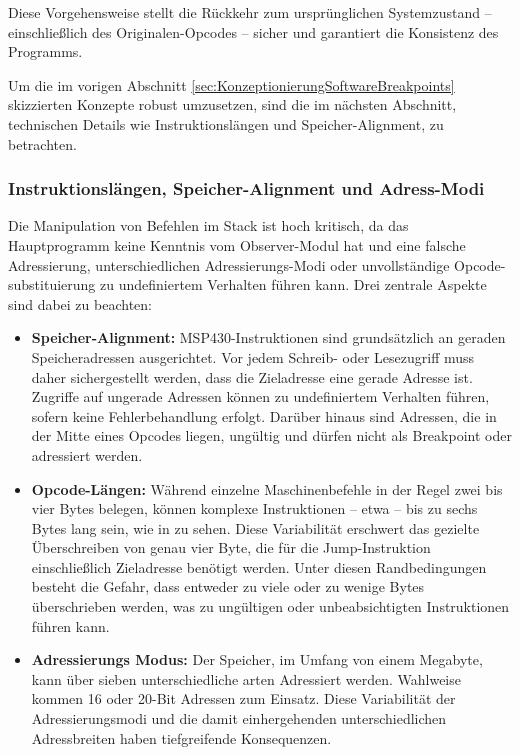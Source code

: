 Diese Vorgehensweise stellt die R\"uckkehr zum urspr\"unglichen Systemzustand – einschlie{\ss}lich des Originalen-Opcodes – sicher und garantiert die Konsistenz des Programms.

Um die im vorigen Abschnitt \ref{sec:KonzeptionierungSoftwareBreakpoints} skizzierten Konzepte robust umzusetzen, sind die im n\"achsten Abschnitt, technischen Details wie Instruktionsl\"angen und Speicher-Alignment, zu betrachten.\AI

\subsubsection{Instruktionsl\"angen, Speicher-Alignment und Adress-Modi}
\label{sec:TechnischeUmsetzunSoftwareBreakpoints}

Die Manipulation von Befehlen im Stack ist hoch kritisch, da das Hauptprogramm keine Kenntnis vom Observer-Modul hat und eine falsche Adressierung, unterschiedlichen Adressierungs-Modi oder unvollst\"andige Opcode-substituierung zu undefiniertem Verhalten f\"uhren kann. Drei zentrale Aspekte sind dabei zu beachten:

\begin{itemize}
	\item \textbf{Speicher-Alignment:} MSP430-Instruktionen sind grundsätzlich an geraden Speicheradressen ausgerichtet. Vor jedem Schreib- oder Lesezugriff muss daher sichergestellt werden, dass die Zieladresse eine gerade Adresse ist. Zugriffe auf ungerade Adressen können zu undefiniertem Verhalten führen, sofern keine Fehlerbehandlung erfolgt. Darüber hinaus sind Adressen, die in der Mitte eines Opcodes liegen, ungültig und dürfen nicht als Breakpoint oder adressiert werden.
	
	\item \textbf{Opcode-L\"angen:} W\"ahrend einzelne Maschinenbefehle in der Regel zwei bis vier Bytes belegen, k\"onnen komplexe Instruktionen – etwa  – bis zu sechs Bytes lang sein, wie in  zu sehen.  Diese Variabilit\"at erschwert das gezielte \"Uberschreiben von genau vier Byte, die f\"ur die Jump-Instruktion einschlie{\ss}lich Zieladresse ben\"otigt werden. Unter diesen Randbedingungen besteht die Gefahr, dass entweder zu viele oder zu wenige Bytes \"uberschrieben werden, was zu ung\"ultigen oder unbeabsichtigten Instruktionen f\"uhren kann.
	
	\item \textbf{Adressierungs Modus:} Der Speicher, im Umfang von einem Megabyte, kann \"uber sieben unterschiedliche arten Adressiert werden. Wahlweise kommen 16 oder 20-Bit Adressen zum Einsatz. Diese Variabilität der Adressierungsmodi und die damit einhergehenden unterschiedlichen Adressbreiten haben tiefgreifende Konsequenzen.
\end{itemize}


